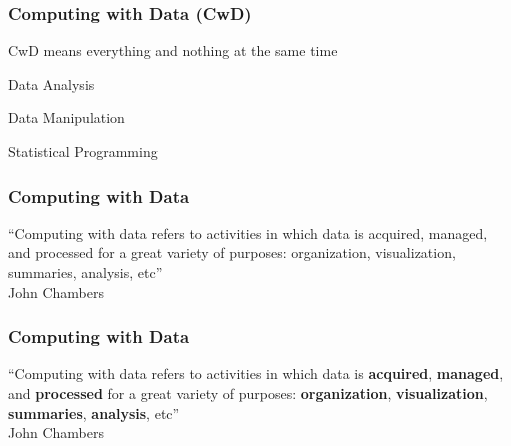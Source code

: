\documentclass[12pt]{beamer}\usepackage[]{graphicx}\usepackage[]{color}
\begin{document}

\begin{frame}
\frametitle{Computing with Data (CwD)}

\pause
\bbi
 \item CwD means everything and nothing at the same time
 \item Data Analysis
 \item Data Manipulation
 \item Statistical Programming
\ei
\eb

\end{frame}


\begin{frame}
\frametitle{Computing with Data}

\Large ``Computing with data refers to activities in which data is acquired, managed, and processed for a great variety of purposes: organization, visualization, summaries, analysis, etc'' \\
{\lit \small{John Chambers}}

\end{frame}


\begin{frame}
\frametitle{Computing with Data}

\Large ``Computing with data refers to activities in which data is \textbf{acquired}, \textbf{managed}, and \textbf{processed} for a great variety of purposes: \textbf{organization}, \textbf{visualization}, \textbf{summaries}, \textbf{analysis}, etc'' \\
{\lit \small{John Chambers}}

\end{frame}


\begin{frame}
\begin{center}
\Huge{}
\end{center}
\end{frame}


\begin{frame}[fragile]
\begin{center}
\end{center}
\end{frame}
\end{document}
